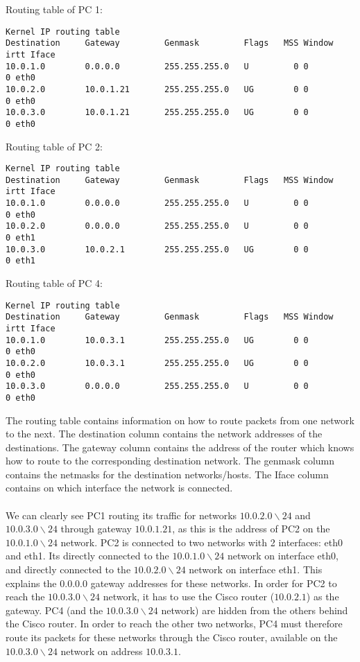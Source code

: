 Routing table of PC 1:
\begin{verbatim}
Kernel IP routing table
Destination     Gateway         Genmask         Flags   MSS Window  irtt Iface
10.0.1.0        0.0.0.0         255.255.255.0   U         0 0          0 eth0
10.0.2.0        10.0.1.21       255.255.255.0   UG        0 0          0 eth0
10.0.3.0        10.0.1.21       255.255.255.0   UG        0 0          0 eth0
\end{verbatim}
Routing table of PC 2:
\begin{verbatim}
Kernel IP routing table
Destination     Gateway         Genmask         Flags   MSS Window  irtt Iface
10.0.1.0        0.0.0.0         255.255.255.0   U         0 0          0 eth0
10.0.2.0        0.0.0.0         255.255.255.0   U         0 0          0 eth1
10.0.3.0        10.0.2.1        255.255.255.0   UG        0 0          0 eth1
\end{verbatim}
Routing table of PC 4:
\begin{verbatim}
Kernel IP routing table
Destination     Gateway         Genmask         Flags   MSS Window  irtt Iface
10.0.1.0        10.0.3.1        255.255.255.0   UG        0 0          0 eth0
10.0.2.0        10.0.3.1        255.255.255.0   UG        0 0          0 eth0
10.0.3.0        0.0.0.0         255.255.255.0   U         0 0          0 eth0
\end{verbatim}

The routing table contains information on how to route packets from one network to the next. The destination column contains the network addresses of the destinations. The gateway column contains the address of the router which knows how to route to the corresponding destination network. The genmask column contains the netmasks for the destination networks/hosts. The Iface column contains on which interface the network is connected.\\\\
We can clearly see PC1 routing its traffic for networks $10.0.2.0 \backslash 24$ and $10.0.3.0 \backslash 24$ through gateway $10.0.1.21$, as this is the address of PC2 on the $10.0.1.0 \backslash 24$ network. PC2 is connected to two networks with 2 interfaces: eth0 and eth1. Its directly connected to the $10.0.1.0 \backslash 24$ network on interface eth0, and directly connected to the $10.0.2.0 \backslash 24$ network on interface eth1. This explains the $0.0.0.0$ gateway addresses for these networks. In order for PC2 to reach the $10.0.3.0 \backslash 24$ network, it has to use the Cisco router ($10.0.2.1$) as the gateway. PC4 (and the $10.0.3.0 \backslash 24$ network) are hidden from the others behind the Cisco router. In order to reach the other two networks, PC4 must therefore route its packets for these networks through the Cisco router, available on the $10.0.3.0 \backslash 24$ network on address $10.0.3.1$.